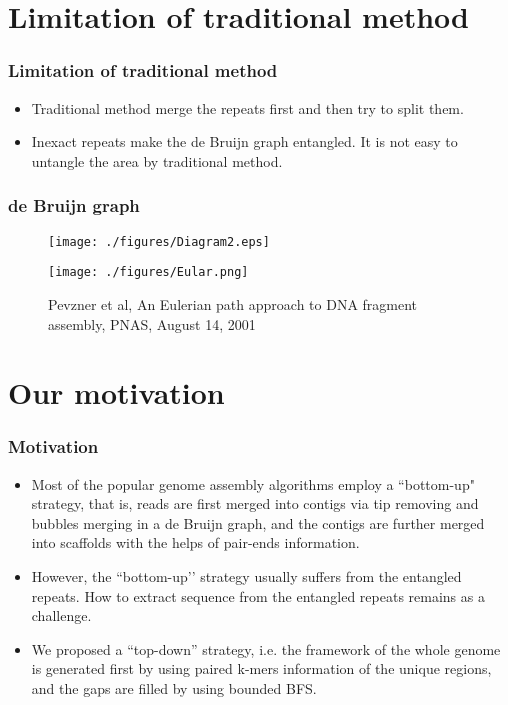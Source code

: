 \documentclass[mathserif]{beamer}
\begin{document}
	\section{Limitation of traditional method}

		\begin{frame}
			\frametitle{Limitation of traditional method}
			\begin{itemize}
				\item Traditional method merge the repeats first and then try to split them.
				\item Inexact repeats make the de Bruijn graph entangled. It is not easy to untangle the area by traditional method.
			\end{itemize}
		\end{frame}
		\begin{frame}
			\frametitle{de Bruijn graph}
			\begin{figure}
				\centering
				\texttt{[image: ./figures/Diagram2.eps]}
			\end{figure}
		\end{frame}
		\begin{frame}
		\begin{figure}
				\centering
				\texttt{[image: ./figures/Eular.png]}
				\caption{\tiny Pevzner et al, An Eulerian path approach to DNA fragment assembly, PNAS, August 14, 2001} 
			\end{figure}
		\end{frame}
	
	\section{Our motivation}
		\begin{frame}
			\frametitle{Motivation}
			\begin{itemize}
				\item Most of the popular genome assembly algorithms employ a ``bottom-up" strategy, that is, reads are first merged into contigs via tip removing and bubbles merging in a de Bruijn graph, and the contigs are further merged into scaffolds with the helps of pair-ends information.  
				\item However, the “bottom-up’’ strategy usually suffers from the entangled repeats. How to extract sequence from the entangled repeats remains as a challenge.
				\item We proposed a “top-down” strategy, i.e. the framework of the whole genome is generated first by using paired k-mers information of the unique regions, and the gaps are filled by using bounded BFS. 
			\end{itemize}
		\end{frame}
\end{document}

